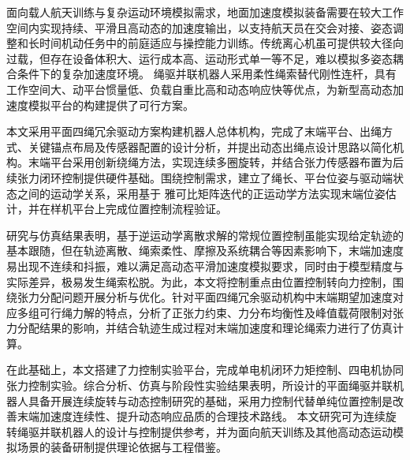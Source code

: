 \begin{cabstract}

面向载人航天训练与复杂运动环境模拟需求，地面加速度模拟装备需要在较大工作空间内实现持续、平滑且高动态的加速度输出，以支持航天员在交会对接、姿态调整和长时间机动任务中的前庭适应与操控能力训练。传统离心机虽可提供较大径向过载，但存在设备体积大、运行成本高、运动形式单一等不足，难以模拟多姿态耦合条件下的复杂加速度环境。
绳驱并联机器人采用柔性绳索替代刚性连杆，具有工作空间大、动平台惯量低、负载自重比高和动态响应快等优点，为新型高动态加速度模拟平台的构建提供了可行方案。

本文采用平面四绳冗余驱动方案构建机器人总体机构，完成了末端平台、出绳方式、关键锚点布局及传感器配置的设计分析，并提出动态出绳点设计思路以简化机构。末端平台采用创新绕绳方法，实现连续多圈旋转，并结合张力传感器布置为后续张力闭环控制提供硬件基础。围绕控制需求，建立了绳长、平台位姿与驱动端状态之间的运动学关系，采用基于
雅可比矩阵迭代的正运动学方法实现末端位姿估计，并在样机平台上完成位置控制流程验证。

研究与仿真结果表明，基于逆运动学离散求解的常规位置控制虽能实现给定轨迹的基本跟随，但在轨迹离散、绳索柔性、摩擦及系统耦合等因素影响下，末端加速度易出现不连续和抖振，难以满足高动态平滑加速度模拟要求，同时由于模型精度与实际差异，极易发生绳索松脱。为此，本文将控制重点由位置控制转向力控制，围绕张力分配问题开展分析与优化。针对平面四绳冗余驱动机构中末端期望加速度对
应多组可行绳力解的特点，分析了正张力约束、力分布均衡性及峰值载荷限制对张力分配结果的影响，并结合轨迹生成过程对末端加速度和理论绳索力进行了仿真计算。

在此基础上，本文搭建了力控制实验平台，完成单电机闭环力矩控制、四电机协同张力控制实验。综合分析、仿真与阶段性实验结果表明，所设计的平面绳驱并联机器人具备开展连续旋转与动态控制研究的基础，采用力控制代替单纯位置控制是改善末端加速度连续性、提升动态响应品质的合理技术路线。
本文研究可为连续旋转绳驱并联机器人的设计与控制提供参考，并为面向航天训练及其他高动态运动模拟场景的装备研制提供理论依据与工程借鉴。

\end{cabstract}

